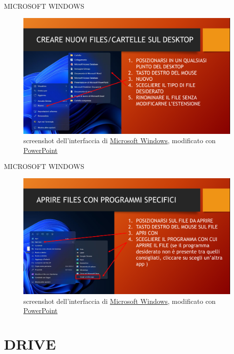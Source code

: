 \documentclass[aspectratio=1610]{beamer}
\begin{document}
\begin{frame}{MICROSOFT WINDOWS}
    \begin{figure}
        \includegraphics[width=\linewidth]{img/windows13.png}
        \caption{screenshot dell'interfaccia di \href{https://www.microsoft.com/}{Microsoft Windows}, modificato con \href{https://www.microsoft.com/it-it/microsoft-365/powerpoint}{PowerPoint}}
    \end{figure}
\end{frame}

\begin{frame}{MICROSOFT WINDOWS}
    \begin{figure}
        \includegraphics[width=\linewidth]{img/windows14.png}
        \caption{screenshot dell'interfaccia di \href{https://www.microsoft.com/}{Microsoft Windows}, modificato con \href{https://www.microsoft.com/it-it/microsoft-365/powerpoint}{PowerPoint}}
    \end{figure}
\end{frame}

\section{DRIVE}
\end{document}
